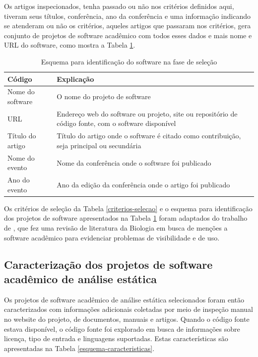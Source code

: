 Os artigos inspecionados, tenha passado ou não nos critérios definidos aqui,
tiveram seus títulos, conferência, ano da conferência e uma informação
indicando se atenderam ou não os critérios, aqueles artigos que passaram nos
critérios, gera conjunto de projetos de software acadêmico com todos esses
dados e mais nome e URL do software, como mostra a Tabela \ref{esquema-selecao}.

\begin{table}[h]
\caption{Esquema para identificação do software na fase de seleção}
\centering
\begin{tabular}{ l p{11cm} }
  \hline
  Código                   & Explicação \\
  \hline
  Nome do software         & O nome do projeto de software \\
  URL                      & Endereço web do software ou projeto, site ou repositório de código fonte, com o software disponível \\
  Título do artigo         & Título do artigo onde o software é citado como contribuição, seja principal ou secundária \\
  Nome do evento           & Nome da conferência onde o software foi publicado \\
  Ano do evento            & Ano da edição da conferência onde o artigo foi publicado \\
  \hline
\end{tabular}
\label{esquema-selecao}
\end{table}

Os critérios de seleção da Tabela \ref{criterios-selecao} e o esquema para
identificação dos projetos de software apresentados na Tabela
\ref{esquema-selecao} foram adaptados do trabalho de
, que fez uma revisão de literatura da Biologia
em busca de menções a software acadêmico para evidenciar problemas de
visibilidade e de uso.


\subsection{Caracterização dos projetos de software acadêmico de análise estática} %

Os projetos de software acadêmico de análise estática selecionados foram então
caracterizados com informações adicionais coletadas por meio de inspeção manual
no website do projeto, de documentos, manuais e artigos. Quando o código fonte
estava disponível, o código fonte foi explorado em busca de informações sobre
licença, tipo de entrada e linguagens suportadas. Estas características são apresentadas
na Tabela \ref{esquema-caracteristicas}.

